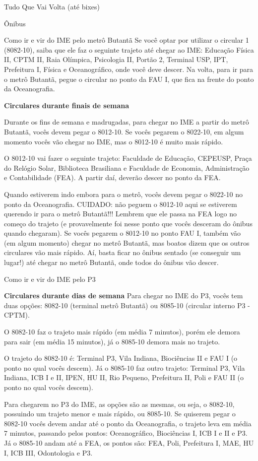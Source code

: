 \begin{secao}{Tudo Que Vai Volta (até bixes)}
\begin{subsecao}{Ônibus}
\begin{subsubsecao}{Como ir e vir do IME pelo metrô Butantã}
Se você optar por utilizar o circular 1 (8082-10), saiba que ele faz o seguinte trajeto 
até chegar ao IME: Educação Física II, CPTM II, Raia Olímpica, Psicologia II, Portão 2, 
Terminal USP, IPT, Prefeitura I, Física e Oceanográfico, onde você deve descer. Na 
volta, para ir para o metrô Butantã, pegue o circular no ponto da FAU I, que fica na frente
do ponto da Oceanografia.

{\bf Circulares durante finais de semana}

Durante os fins de semana e madrugadas, para chegar no IME 
a partir do metrô Butantã, vocês devem pegar o 8012-10. 
Se vocês pegarem o 8022-10, em algum momento vocês 
vão chegar no IME, mas o 8012-10 é muito mais rápido.

O 8012-10 vai fazer o seguinte trajeto: Faculdade de Educação, CEPEUSP,
Praça do Relógio Solar, Biblioteca Brasiliana e Faculdade de Economia,
Administração e Contabilidade (FEA). A partir daí, deverão descer no ponto da
FEA.

Quando estiverem indo embora para o metrô, vocês devem pegar o 8022-10
no ponto da Oceanografia. CUIDADO: não peguem o 8012-10 aqui
se estiverem querendo ir para o metrô Butantã!!! Lembrem que ele passa na
FEA logo no começo do trajeto (e provavelmente foi nesse ponto que vocês
desceram do ônibus quando chegaram). Se vocês pegarem o 8012-10
no ponto FAU I, também vão (em algum momento) chegar no metrô Butantã, mas
boatos dizem que os outros circulares vão mais rápido. Aí, basta ficar no
ônibus sentado (se conseguir um lugar!) até chegar no metrô Butantã, onde 
todos do ônibus vão descer.

\end{subsubsecao}

\begin{subsubsecao}{Como ir e vir do IME pelo P3}

{\bf Circulares durante dias de semana}
Para chegar no IME do P3, vocês tem duas opções: 8082-10 (terminal metrô 
Butantã) ou 8085-10 (circular interno P3 - CPTM). 

O 8082-10 faz o trajeto mais rápido (em média 7 minutos), porém ele demora para sair 
(em média 15 minutos), já o 8085-10 demora mais no trajeto.

O trajeto do 8082-10 é: Terminal P3, Vila Indiana, Biociências II e FAU I
(o ponto no qual vocês descem). Já o 8085-10 faz outro trajeto: Terminal P3,
Vila Indiana, ICB I e II, IPEN, HU II, Rio Pequeno, Prefeitura II, Poli e FAU II
(o ponto no qual vocês descem).

Para chegarem no P3 do IME, as opções são as mesmas, ou seja, o 8082-10, possuindo 
um trajeto menor e mais rápido, ou 8085-10. Se quiserem pegar o 8082-10 vocês 
devem andar até o ponto da Oceanografia, o trajeto leva em média 7 minutos, 
passando pelos pontos: Oceanográfico, Biociências I, ICB I e II e P3. 
Já o 8085-10 andam até a FEA, os pontos são: FEA, Poli, Prefeitura I, MAE, 
HU I, ICB III, Odontologia e P3.


\end{subsubsecao}
\end{subsecao}
\end{secao}
